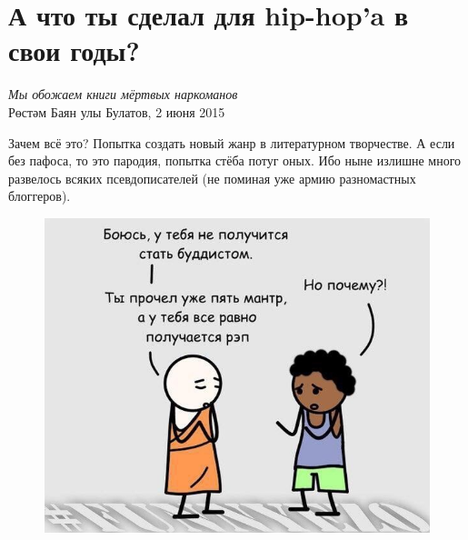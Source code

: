 \documentclass{ideas}
\begin{document}
\section*{А что ты сделал для hip-hop'a в свои годы?}\label{section:one}
\begin{displayquote}
\begin{flushright}
    \emph{Мы обожаем книги мёртвых наркоманов}\\
    Рөстәм Баян улы Булатов, 2 июня 2015
\end{flushright}
\end{displayquote}
Зачем всё это? Попытка создать новый жанр в литературном творчестве.
А если без пафоса, то это пародия, попытка стёба потуг оных. Ибо ныне излишне много развелось всяких псевдописателей (не поминая уже армию разномастных блоггеров).

\begin{figure}[ht!]
    \centering
    \includegraphics[width=\textwidth]{hip-zen}
\end{figure}






\end{document}
